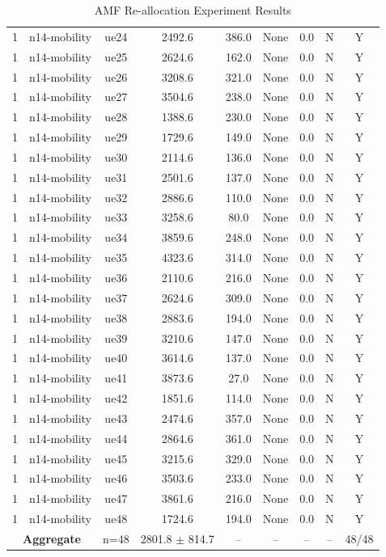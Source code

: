 \begin{table}[ht]
\begin{tabular}{|c|c|c|c|c|c|c|c|c|}
1 & n14-mobility & ue24 & 2492.6 & 386.0 & None & 0.0 & N & Y \\
1 & n14-mobility & ue25 & 2624.6 & 162.0 & None & 0.0 & N & Y \\
1 & n14-mobility & ue26 & 3208.6 & 321.0 & None & 0.0 & N & Y \\
1 & n14-mobility & ue27 & 3504.6 & 238.0 & None & 0.0 & N & Y \\
1 & n14-mobility & ue28 & 1388.6 & 230.0 & None & 0.0 & N & Y \\
1 & n14-mobility & ue29 & 1729.6 & 149.0 & None & 0.0 & N & Y \\
1 & n14-mobility & ue30 & 2114.6 & 136.0 & None & 0.0 & N & Y \\
1 & n14-mobility & ue31 & 2501.6 & 137.0 & None & 0.0 & N & Y \\
1 & n14-mobility & ue32 & 2886.6 & 110.0 & None & 0.0 & N & Y \\
1 & n14-mobility & ue33 & 3258.6 & 80.0 & None & 0.0 & N & Y \\
1 & n14-mobility & ue34 & 3859.6 & 248.0 & None & 0.0 & N & Y \\
1 & n14-mobility & ue35 & 4323.6 & 314.0 & None & 0.0 & N & Y \\
1 & n14-mobility & ue36 & 2110.6 & 216.0 & None & 0.0 & N & Y \\
1 & n14-mobility & ue37 & 2624.6 & 309.0 & None & 0.0 & N & Y \\
1 & n14-mobility & ue38 & 2883.6 & 194.0 & None & 0.0 & N & Y \\
1 & n14-mobility & ue39 & 3210.6 & 147.0 & None & 0.0 & N & Y \\
1 & n14-mobility & ue40 & 3614.6 & 137.0 & None & 0.0 & N & Y \\
1 & n14-mobility & ue41 & 3873.6 & 27.0 & None & 0.0 & N & Y \\
1 & n14-mobility & ue42 & 1851.6 & 114.0 & None & 0.0 & N & Y \\
1 & n14-mobility & ue43 & 2474.6 & 357.0 & None & 0.0 & N & Y \\
1 & n14-mobility & ue44 & 2864.6 & 361.0 & None & 0.0 & N & Y \\
1 & n14-mobility & ue45 & 3215.6 & 329.0 & None & 0.0 & N & Y \\
1 & n14-mobility & ue46 & 3503.6 & 233.0 & None & 0.0 & N & Y \\
1 & n14-mobility & ue47 & 3861.6 & 216.0 & None & 0.0 & N & Y \\
1 & n14-mobility & ue48 & 1724.6 & 194.0 & None & 0.0 & N & Y \\
\multicolumn{2}{|c|}{\textbf{Aggregate}} & n=48 & 2801.8 $\pm$ 814.7 & -- & -- & -- & -- & 48/48 \\
\hline
\end{tabular}
\caption{AMF Re-allocation Experiment Results}
\label{tab:amf_realloc}
\end{table}
